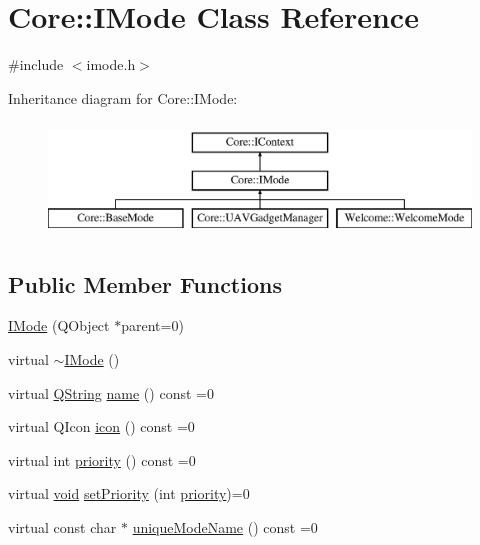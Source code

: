 \hypertarget{class_core_1_1_i_mode}{\section{\-Core\-:\-:\-I\-Mode \-Class \-Reference}
\label{class_core_1_1_i_mode}
}


{\ttfamily \#include $<$imode.\-h$>$}

\-Inheritance diagram for \-Core\-:\-:\-I\-Mode\-:\begin{figure}[H]
\begin{center}
\leavevmode
\includegraphics[height=3.000000cm]{class_core_1_1_i_mode}
\end{center}
\end{figure}
\subsection*{\-Public \-Member \-Functions}
\begin{DoxyCompactItemize}
\item 
\hyperlink{group___core_plugin_gaccbaa8bb681f8edbb321c1c05be26b9f}{\-I\-Mode} (\-Q\-Object $\ast$parent=0)
\item 
virtual \hyperlink{group___core_plugin_gae2b3ddcbc2ff1bd704871321bfd456b6}{$\sim$\-I\-Mode} ()
\item 
virtual \hyperlink{group___u_a_v_objects_plugin_gab9d252f49c333c94a72f97ce3105a32d}{\-Q\-String} \hyperlink{group___core_plugin_ga5892453cd69d59f044a66007256caa28}{name} () const =0
\item 
virtual \-Q\-Icon \hyperlink{group___core_plugin_ga08aee89ee18cb2f86fef5547c93eb324}{icon} () const =0
\item 
virtual int \hyperlink{group___core_plugin_gac22cc2ad63d314df4660f6345a7fff2c}{priority} () const =0
\item 
virtual \hyperlink{group___u_a_v_objects_plugin_ga444cf2ff3f0ecbe028adce838d373f5c}{void} \hyperlink{group___core_plugin_gab10108fb673e8128fb31d671a8a8db79}{set\-Priority} (int \hyperlink{group___core_plugin_gac22cc2ad63d314df4660f6345a7fff2c}{priority})=0
\item 
virtual const char $\ast$ \hyperlink{group___core_plugin_gab42870ab42d71194c7f6de4afe58fba5}{unique\-Mode\-Name} () const =0
\end{DoxyCompactItemize}


